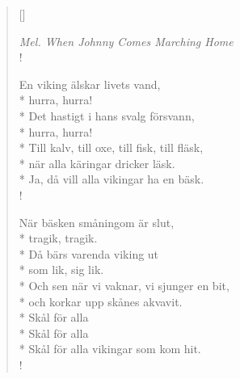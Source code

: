 
\settowidth{\versewidth}{Nej, för fan bara blunda och svälj}



\begin{verse}[\versewidth]

\flagverse{}
\emph{Mel. When Johnny Comes Marching Home}\\!

En viking älskar livets vand,\\*
hurra, hurra!\\*
Det hastigt i hans svalg försvann,\\*
hurra, hurra!\\*
Till kalv, till oxe, till fisk, till fläsk,\\*
när alla käringar dricker läsk.\\*
Ja, då vill alla vikingar ha en bäsk.\\!


När bäsken småningom är slut,\\*
tragik, tragik.\\*
Då bärs varenda viking ut\\*
som lik, sig lik.\\*
Och sen när vi vaknar, vi sjunger en bit,\\*
och korkar upp skånes akvavit.\\*
Skål för alla\\*
Skål för alla\\*
Skål för alla vikingar som kom hit.\\!




\end{verse}

